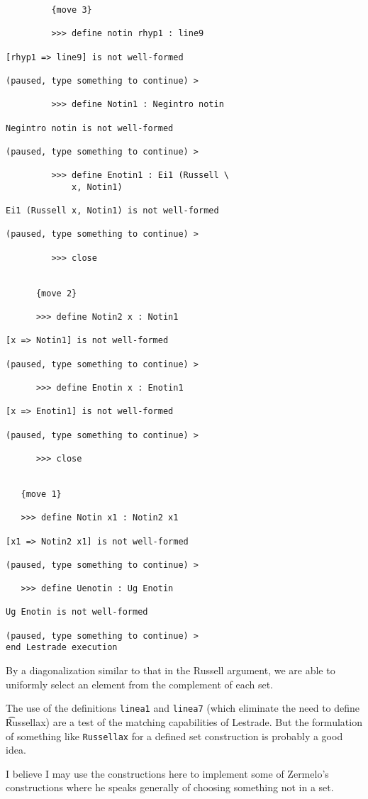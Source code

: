 \documentclass[12pt]{article}
\begin{document}
\begin{verbatim}
         {move 3}

         >>> define notin rhyp1 : line9

[rhyp1 => line9] is not well-formed

(paused, type something to continue) >

         >>> define Notin1 : Negintro notin

Negintro notin is not well-formed

(paused, type something to continue) >

         >>> define Enotin1 : Ei1 (Russell \
             x, Notin1)

Ei1 (Russell x, Notin1) is not well-formed

(paused, type something to continue) >

         >>> close


      {move 2}

      >>> define Notin2 x : Notin1

[x => Notin1] is not well-formed

(paused, type something to continue) >

      >>> define Enotin x : Enotin1

[x => Enotin1] is not well-formed

(paused, type something to continue) >

      >>> close


   {move 1}

   >>> define Notin x1 : Notin2 x1

[x1 => Notin2 x1] is not well-formed

(paused, type something to continue) >

   >>> define Uenotin : Ug Enotin

Ug Enotin is not well-formed

(paused, type something to continue) >
end Lestrade execution
\end{verbatim}

By a diagonalization similar to that in the Russell argument, we are able to uniformly select an element from the complement of each set.

The use of the definitions {\tt linea1} and {\tt linea7} (which eliminate the need to define {\t Russellax}) are a test of the matching capabilities of Lestrade.  But the formulation of something like {\tt Russellax} for a defined set construction is probably a good idea.

I believe I may use the constructions here to implement some of Zermelo's constructions where he speaks generally of choosing something not in a set.
\end{document}
